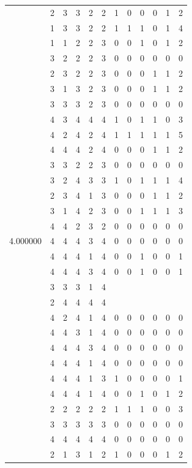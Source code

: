 \documentclass[]{book}
\theoremstyle{definition}
\theoremstyle{definition}
\theoremstyle{definition}
\theoremstyle{remark}
\begin{document}
\begin{table}
{\begin{tabular}[t]{rrrrrrrrrrrr}
 & 2 & 3 & 3 & 2 & 2 & 1 & 0 & 0 & 0 & 1 & 2\\
 & 1 & 3 & 3 & 2 & 2 & 1 & 1 & 1 & 0 & 1 & 4\\
 & 1 & 1 & 2 & 2 & 3 & 0 & 0 & 1 & 0 & 1 & 2\\
 & 3 & 2 & 2 & 2 & 3 & 0 & 0 & 0 & 0 & 0 & 0\\
 & 2 & 3 & 2 & 2 & 3 & 0 & 0 & 0 & 1 & 1 & 2\\
 & 3 & 1 & 3 & 2 & 3 & 0 & 0 & 0 & 1 & 1 & 2\\
 & 3 & 3 & 3 & 2 & 3 & 0 & 0 & 0 & 0 & 0 & 0\\
 & 4 & 3 & 4 & 4 & 4 & 1 & 0 & 1 & 1 & 0 & 3\\
 & 4 & 2 & 4 & 2 & 4 & 1 & 1 & 1 & 1 & 1 & 5\\
 & 4 & 4 & 4 & 2 & 4 & 0 & 0 & 0 & 1 & 1 & 2\\
 & 3 & 3 & 2 & 2 & 3 & 0 & 0 & 0 & 0 & 0 & 0\\
 & 3 & 2 & 4 & 3 & 3 & 1 & 0 & 1 & 1 & 1 & 4\\
 & 2 & 3 & 4 & 1 & 3 & 0 & 0 & 0 & 1 & 1 & 2\\
 & 3 & 1 & 4 & 2 & 3 & 0 & 0 & 1 & 1 & 1 & 3\\
 & 4 & 4 & 2 & 3 & 2 & 0 & 0 & 0 & 0 & 0 & 0\\
4.000000 & 4 & 4 & 4 & 3 & 4 & 0 & 0 & 0 & 0 & 0 & 0\\
 & 4 & 4 & 4 & 1 & 4 & 0 & 0 & 1 & 0 & 0 & 1\\
 & 4 & 4 & 4 & 3 & 4 & 0 & 0 & 1 & 0 & 0 & 1\\
 & 3 & 3 & 3 & 1 & 4 &  &  &  &  &  & \\
 & 2 & 4 & 4 & 4 & 4 &  &  &  &  &  & \\
 & 4 & 2 & 4 & 1 & 4 & 0 & 0 & 0 & 0 & 0 & 0\\
 & 4 & 4 & 3 & 1 & 4 & 0 & 0 & 0 & 0 & 0 & 0\\
 & 4 & 4 & 4 & 3 & 4 & 0 & 0 & 0 & 0 & 0 & 0\\
 & 4 & 4 & 4 & 1 & 4 & 0 & 0 & 0 & 0 & 0 & 0\\
 & 4 & 4 & 4 & 1 & 3 & 1 & 0 & 0 & 0 & 0 & 1\\
 & 4 & 4 & 4 & 1 & 4 & 0 & 0 & 1 & 0 & 1 & 2\\
 & 2 & 2 & 2 & 2 & 2 & 1 & 1 & 1 & 0 & 0 & 3\\
 & 3 & 3 & 3 & 3 & 3 & 0 & 0 & 0 & 0 & 0 & 0\\
 & 4 & 4 & 4 & 4 & 4 & 0 & 0 & 0 & 0 & 0 & 0\\
 & 2 & 1 & 3 & 1 & 2 & 1 & 0 & 0 & 0 & 1 & 2\\

\end{tabular}}
\end{table}
\end{document}
